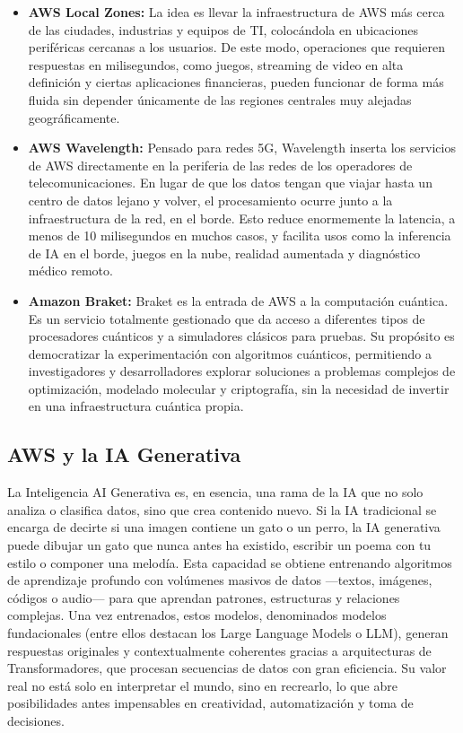 \documentclass[12pt,a4paper]{article}
\begin{document}
\begin{itemize}
\item \textbf{AWS Local Zones:} La idea es llevar la infraestructura de AWS más cerca de las ciudades, industrias y equipos de TI, colocándola en ubicaciones periféricas cercanas a los usuarios. De este modo, operaciones que requieren respuestas en milisegundos, como juegos, streaming de video en alta definición y ciertas aplicaciones financieras, pueden funcionar de forma más fluida sin depender únicamente de las regiones centrales muy alejadas geográficamente.

\item \textbf{AWS Wavelength:} Pensado para redes 5G, Wavelength inserta los servicios de AWS directamente en la periferia de las redes de los operadores de telecomunicaciones. En lugar de que los datos tengan que viajar hasta un centro de datos lejano y volver, el procesamiento ocurre junto a la infraestructura de la red, en el borde. Esto reduce enormemente la latencia, a menos de 10 milisegundos en muchos casos, y facilita usos como la inferencia de IA en el borde, juegos en la nube, realidad aumentada y diagnóstico médico remoto.

\item \textbf{Amazon Braket:} Braket es la entrada de AWS a la computación cuántica. Es un servicio totalmente gestionado que da acceso a diferentes tipos de procesadores cuánticos y a simuladores clásicos para pruebas. Su propósito es democratizar la experimentación con algoritmos cuánticos, permitiendo a investigadores y desarrolladores explorar soluciones a problemas complejos de optimización, modelado molecular y criptografía, sin la necesidad de invertir en una infraestructura cuántica propia.
\end{itemize}

\subsection{AWS y la IA Generativa}

La Inteligencia AI Generativa es, en esencia, una rama de la IA que no solo analiza o clasifica datos, sino que crea contenido nuevo. Si la IA tradicional se encarga de decirte si una imagen contiene un gato o un perro, la IA generativa puede dibujar un gato que nunca antes ha existido, escribir un poema con tu estilo o componer una melodía. Esta capacidad se obtiene entrenando algoritmos de aprendizaje profundo con volúmenes masivos de datos —textos, imágenes, códigos o audio— para que aprendan patrones, estructuras y relaciones complejas. Una vez entrenados, estos modelos, denominados modelos fundacionales (entre ellos destacan los Large Language Models o LLM), generan respuestas originales y contextualmente coherentes gracias a arquitecturas de Transformadores, que procesan secuencias de datos con gran eficiencia. Su valor real no está solo en interpretar el mundo, sino en recrearlo, lo que abre posibilidades antes impensables en creatividad, automatización y toma de decisiones.
\end{document}
